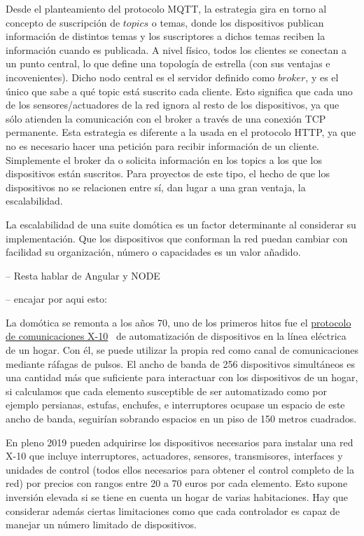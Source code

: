 Desde el planteamiento del protocolo MQTT, la estrategia gira en torno al concepto de suscripción de $topics$ o temas, donde los dispositivos publican información de distintos temas y los suscriptores a dichos temas reciben la información cuando es publicada. A nivel físico, todos los clientes se conectan a un punto central, lo que define una topología de estrella (con sus ventajas e incovenientes). Dicho nodo central es el servidor definido como $broker$, y es el único que sabe a qué topic está suscrito cada cliente. Esto significa que cada uno de los sensores/actuadores de la red ignora al resto de los dispositivos, ya que sólo atienden la comunicación con el broker a través de una conexión TCP permanente. Esta estrategia es diferente a la usada en el protocolo HTTP, ya que no es necesario hacer una petición para recibir información de un cliente. Simplemente el broker da o solicita información en los topics a los que los dispositivos están suscritos. Para proyectos de este tipo, el hecho de que los dispositivos no se relacionen entre sí, dan lugar a una gran ventaja, la escalabilidad.

\vspace{1.5cm}

La escalabilidad de una suite domótica es un factor determinante al considerar su implementación. Que los dispositivos que conforman la red puedan cambiar con facilidad su organización, número o capacidades es un valor añadido.

-- Resta hablar de Angular y NODE

-- encajar por aqui esto:

La domótica se remonta a los años 70, uno de los primeros hitos fue el \href{https://es.wikipedia.org/wiki/X10}{protocolo de comunicaciones X-10}~\cite{x10protocolwikipedia} de automatización de dispositivos en la línea eléctrica de un hogar. Con él, se puede utilizar la propia red como canal de comunicaciones mediante ráfagas de pulsos. El ancho de banda de 256 dispositivos simultáneos es una cantidad más que suficiente para interactuar con los dispositivos de un hogar, si calculamos que cada elemento susceptible de ser automatizado como por ejemplo persianas, estufas, enchufes, e interruptores ocupase un espacio de este ancho de banda, seguirían sobrando espacios en un piso de 150 metros cuadrados.

\vspace{1.5cm}

En pleno 2019 pueden adquirirse los dispositivos necesarios para instalar una red X-10 que incluye interruptores, actuadores, sensores, transmisores, interfaces y unidades de control (todos ellos necesarios para obtener el control completo de la red) por precios con rangos entre 20 a 70 euros por cada elemento. Esto supone inversión elevada si se tiene en cuenta un hogar de varias habitaciones. Hay que considerar además ciertas limitaciones como que cada controlador es capaz de manejar un número limitado de dispositivos.

